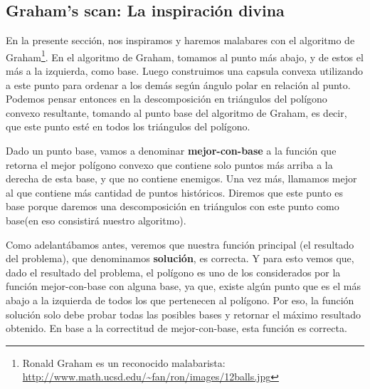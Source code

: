 \subsection{Graham's scan: La inspiración divina}
\par{En la presente sección, nos inspiramos y haremos malabares con el algoritmo de Graham\footnote{Ronald Graham es un reconocido malabarista: \url{http://www.math.ucsd.edu/~fan/ron/images/12balls.jpg}}.
En el algoritmo de Graham, tomamos al punto más abajo, y de estos el más a la izquierda, como base. Luego construimos una capsula convexa utilizando a este punto para ordenar a los demás según ángulo polar en relación al punto. Podemos pensar entonces en la descomposición en triángulos del polígono convexo resultante, tomando al punto base del algoritmo de Graham, es decir, que este punto esté en todos los triángulos del polígono.} \newline

\par{Dado un punto base, vamos a denominar \textbf{mejor-con-base} a la función que retorna el mejor polígono convexo que contiene solo puntos más arriba a la derecha de esta base, y que no contiene enemigos. Una vez más, llamamos mejor al que contiene más cantidad de puntos históricos. Diremos que este punto es base porque daremos una descomposición en triángulos con este punto como base(en eso consistirá nuestro algoritmo).} \newline
\par{Como adelantábamos antes, veremos que nuestra función principal (el resultado del problema), que denominamos \textbf{solución}, es correcta. Y para esto vemos que, dado el resultado del problema, el polígono es uno de los considerados por la función mejor-con-base con alguna base, ya que, existe algún punto que es el más abajo a la izquierda de todos los que pertenecen al polígono. Por eso, la función solución solo debe probar todas las posibles bases y retornar el máximo resultado obtenido. En base a la correctitud de mejor-con-base, esta función es correcta.} \newline

